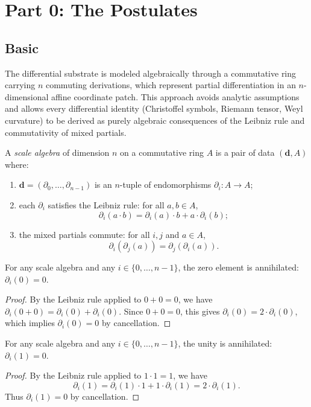 \section{Part 0: The Postulates}

\subsection{Basic}

The differential substrate is modeled algebraically through a commutative ring carrying $n$ commuting derivations, which represent partial differentiation in an $n$-dimensional affine coordinate patch. This approach avoids analytic assumptions and allows every differential identity (Christoffel symbols, Riemann tensor, Weyl curvature) to be derived as purely algebraic consequences of the Leibniz rule and commutativity of mixed partials.

\begin{definition}
A \emph{scale algebra} of dimension $n$ on a commutative ring $A$ is a pair of data $(\mathbf{d}, A)$ where:
\begin{enumerate}
\item $\mathbf{d} = (\partial_0, \ldots, \partial_{n-1})$ is an $n$-tuple of endomorphisms $\partial_i : A \to A$;
\item each $\partial_i$ satisfies the Leibniz rule: for all $a, b \in A$,
  $$\partial_i(a \cdot b) = \partial_i(a) \cdot b + a \cdot \partial_i(b);$$
\item the mixed partials commute: for all $i, j$ and $a \in A$,
  $$\partial_i(\partial_j(a)) = \partial_j(\partial_i(a)).$$
\end{enumerate}
\end{definition}

\begin{theorem}
For any scale algebra and any $i \in \{0,\ldots,n-1\}$, the zero element is annihilated: $\partial_i(0) = 0$.
\end{theorem}
\begin{proof}
By the Leibniz rule applied to $0 + 0 = 0$, we have $\partial_i(0 + 0) = \partial_i(0) + \partial_i(0)$. Since $0 + 0 = 0$, this gives $\partial_i(0) = 2 \cdot \partial_i(0)$, which implies $\partial_i(0) = 0$ by cancellation.
\end{proof}

\begin{theorem}
For any scale algebra and any $i \in \{0,\ldots,n-1\}$, the unity is annihilated: $\partial_i(1) = 0$.
\end{theorem}
\begin{proof}
By the Leibniz rule applied to $1 \cdot 1 = 1$, we have
$$\partial_i(1) = \partial_i(1) \cdot 1 + 1 \cdot \partial_i(1) = 2 \cdot \partial_i(1).$$
Thus $\partial_i(1) = 0$ by cancellation.
\end{proof}

